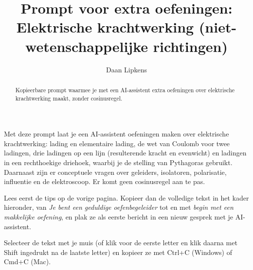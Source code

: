\documentclass{ximera}
\title{Prompt voor extra oefeningen: Elektrische krachtwerking (niet-wetenschappelijke richtingen)}
\author{Daan Lipkens}
\begin{document}
\begin{abstract}
    Kopieerbare prompt waarmee je met een AI-assistent extra oefeningen over elektrische krachtwerking maakt, zonder cosinusregel.
\end{abstract}
\maketitle

Met deze prompt laat je een AI-assistent oefeningen maken over elektrische krachtwerking: lading en elementaire lading, de wet van Coulomb voor twee ladingen, drie ladingen op een lijn (resulterende kracht en evenwicht) en ladingen in een rechthoekige driehoek, waarbij je de stelling van Pythagoras gebruikt. Daarnaast zijn er conceptuele vragen over geleiders, isolatoren, polarisatie, influentie en de elektroscoop. Er komt geen cosinusregel aan te pas.

Lees eerst de tips op de vorige pagina. Kopieer dan de volledige tekst in het kader hieronder, van \textit{Je bent een geduldige oefenbegeleider} tot en met \textit{begin met een makkelijke oefening}, en plak ze als eerste bericht in een nieuw gesprek met je AI-assistent.

\begin{onlineOnly}
    Selecteer de tekst met je muis (of klik voor de eerste letter en klik daarna met Shift ingedrukt na de laatste letter) en kopieer ze met Ctrl+C (Windows) of Cmd+C (Mac).
\end{onlineOnly}
\end{document}
